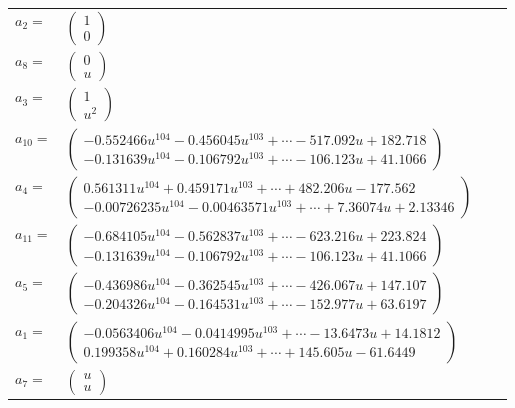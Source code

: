 \documentclass[1p]{elsarticle_modified}
\theoremstyle{definition}
\begin{document}
\begin{tabular}{m{7pt} m{180pt} m{7pt} m{180pt} }
\flushright $a_{2}=$&$\begin{pmatrix}1\\0\end{pmatrix}$ \\
\flushright $a_{8}=$&$\begin{pmatrix}0\\u\end{pmatrix}$ \\
\flushright $a_{3}=$&$\begin{pmatrix}1\\u^2\end{pmatrix}$ \\
\flushright $a_{10}=$&$\begin{pmatrix}-0.552466 u^{104}-0.456045 u^{103}+\cdots-517.092 u+182.718\\-0.131639 u^{104}-0.106792 u^{103}+\cdots-106.123 u+41.1066\end{pmatrix}$ \\
\flushright $a_{4}=$&$\begin{pmatrix}0.561311 u^{104}+0.459171 u^{103}+\cdots+482.206 u-177.562\\-0.00726235 u^{104}-0.00463571 u^{103}+\cdots+7.36074 u+2.13346\end{pmatrix}$ \\
\flushright $a_{11}=$&$\begin{pmatrix}-0.684105 u^{104}-0.562837 u^{103}+\cdots-623.216 u+223.824\\-0.131639 u^{104}-0.106792 u^{103}+\cdots-106.123 u+41.1066\end{pmatrix}$ \\
\flushright $a_{5}=$&$\begin{pmatrix}-0.436986 u^{104}-0.362545 u^{103}+\cdots-426.067 u+147.107\\-0.204326 u^{104}-0.164531 u^{103}+\cdots-152.977 u+63.6197\end{pmatrix}$ \\
\flushright $a_{1}=$&$\begin{pmatrix}-0.0563406 u^{104}-0.0414995 u^{103}+\cdots-13.6473 u+14.1812\\0.199358 u^{104}+0.160284 u^{103}+\cdots+145.605 u-61.6449\end{pmatrix}$ \\
\flushright $a_{7}=$&$\begin{pmatrix}u\\u\end{pmatrix}$ \\

\end{tabular}
\end{document}
